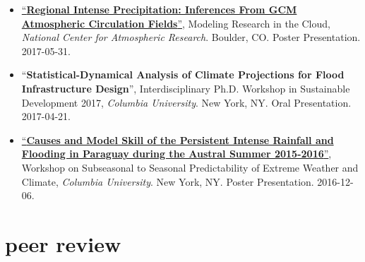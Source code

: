 \documentclass[10pt,oneside]{article}
\begin{document}
\begin{itemize}[label={}]
  \item \href{https://doi.org/10.6084/m9.figshare.8277167.v1}{\enquote{\textbf{Regional Intense Precipitation: Inferences From GCM Atmospheric Circulation Fields}}}, Modeling Research in the Cloud,  \textit{National Center for Atmospheric Research}. Boulder, CO. Poster Presentation. 2017-05-31.
  
  \item \enquote{\textbf{Statistical-Dynamical Analysis of Climate Projections for Flood Infrastructure Design}}, Interdisciplinary Ph.D. Workshop in Sustainable Development 2017,  \textit{Columbia University}. New York, NY. Oral Presentation. 2017-04-21.
  
  \item \href{https://doi.org/10.13140/RG.2.2.20146.30406}{\enquote{\textbf{Causes and Model Skill of the Persistent Intense Rainfall and Flooding in Paraguay during the Austral Summer 2015-2016}}}, Workshop on Subseasonal to Seasonal Predictability of Extreme Weather and Climate,  \textit{Columbia University}. New York, NY. Poster Presentation. 2016-12-06.
  
\end{itemize}


\section{peer review}

\mbox{}\vspace{-\dimexpr\baselineskip\relax}
\end{document}
